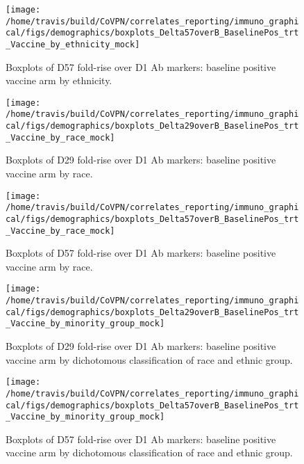 \documentclass[]{book}
\theoremstyle{definition}
\theoremstyle{definition}
\theoremstyle{definition}
\newcommand{\1}{\mathbbm{1}}
\begin{document}
\begin{figure}[H]

{\centering \texttt{[image: /home/travis/build/CoVPN/correlates\_reporting/immuno\_graphical/figs/demographics/boxplots\_Delta57overB\_BaselinePos\_trt\_Vaccine\_by\_ethnicity\_mock]} 

}

\caption{Boxplots of D57 fold-rise over D1 Ab markers: baseline positive vaccine arm by ethnicity.}\label{fig:unnamed-chunk-187}
\end{figure}

\begin{figure}[H]

{\centering \texttt{[image: /home/travis/build/CoVPN/correlates\_reporting/immuno\_graphical/figs/demographics/boxplots\_Delta29overB\_BaselinePos\_trt\_Vaccine\_by\_race\_mock]} 

}

\caption{Boxplots of D29 fold-rise over D1 Ab markers: baseline positive vaccine arm by race.}\label{fig:unnamed-chunk-190}
\end{figure}

\begin{figure}[H]

{\centering \texttt{[image: /home/travis/build/CoVPN/correlates\_reporting/immuno\_graphical/figs/demographics/boxplots\_Delta57overB\_BaselinePos\_trt\_Vaccine\_by\_race\_mock]} 

}

\caption{Boxplots of D57 fold-rise over D1 Ab markers: baseline positive vaccine arm by race.}\label{fig:unnamed-chunk-191}
\end{figure}

\begin{figure}[H]

{\centering \texttt{[image: /home/travis/build/CoVPN/correlates\_reporting/immuno\_graphical/figs/demographics/boxplots\_Delta29overB\_BaselinePos\_trt\_Vaccine\_by\_minority\_group\_mock]} 

}

\caption{Boxplots of D29 fold-rise over D1 Ab markers: baseline positive vaccine arm by dichotomous classification of race and ethnic group.}\label{fig:unnamed-chunk-194}
\end{figure}

\begin{figure}[H]

{\centering \texttt{[image: /home/travis/build/CoVPN/correlates\_reporting/immuno\_graphical/figs/demographics/boxplots\_Delta57overB\_BaselinePos\_trt\_Vaccine\_by\_minority\_group\_mock]} 

}

\caption{Boxplots of D57 fold-rise over D1 Ab markers: baseline positive vaccine arm by dichotomous classification of race and ethnic group.}\label{fig:unnamed-chunk-195}
\end{figure}
\end{document}
